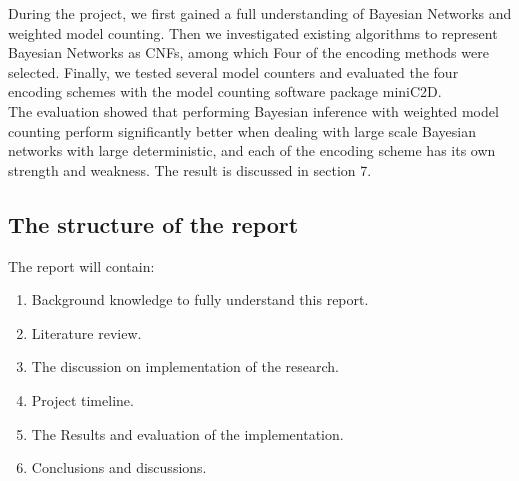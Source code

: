     \noindent During the project, we first gained a full understanding of Bayesian Networks and weighted model counting. Then we investigated existing algorithms to represent Bayesian Networks as CNFs, among which Four of the encoding methods were selected. Finally, we tested several model counters and evaluated the four encoding schemes with the model counting software package miniC2D.\\
    
    \noindent The evaluation showed that performing Bayesian inference with weighted model counting perform significantly better when dealing with large scale Bayesian networks with large deterministic, and each of the encoding scheme has its own strength and weakness. The result is discussed in section 7. 


    \subsection{The structure of the report}
    The report will contain:
    \begin{enumerate}
        \item Background knowledge to fully understand this report.
        \item Literature review.
        \item The discussion on implementation of the research.
        \item Project timeline.
        \item The Results and evaluation of the implementation.
        \item Conclusions and discussions.
    \end{enumerate}

\newpage